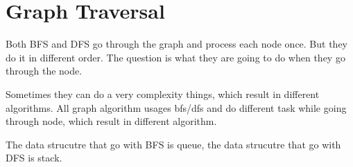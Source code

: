 \section{Graph Traversal}

Both BFS and DFS go through the graph and process each node once. But they do it in different order.
The question is what they are going to do when they go through the node.

Sometimes they can do a very complexity things, which result in different algorithms. All graph algorithm usages bfs/dfs and do different task while going through node, which result in different algorithm.

The data strucutre that go with BFS is queue, the data strucutre that go with DFS is stack.


